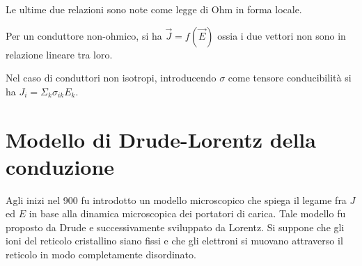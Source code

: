 Le ultime due relazioni sono note come legge di Ohm in forma locale.

Per un conduttore non-ohmico, si ha $ \vec{J} = f(\vec{E} ) $ ossia i due vettori non sono in relazione lineare tra loro.

Nel caso di conduttori non isotropi, introducendo $ \sigma $ come tensore conducibilità si ha $J_i= \Sigma_k\sigma_{ik}E_k$.

\section{Modello di Drude-Lorentz della conduzione}

Agli inizi nel 900 fu introdotto un modello microscopico che spiega il legame fra $J$ ed $E$ in base alla dinamica microscopica dei portatori di carica. Tale modello fu proposto da Drude e successivamente sviluppato da Lorentz. Si suppone che gli ioni del reticolo cristallino siano fissi e che gli elettroni si muovano attraverso il reticolo in modo completamente disordinato.

